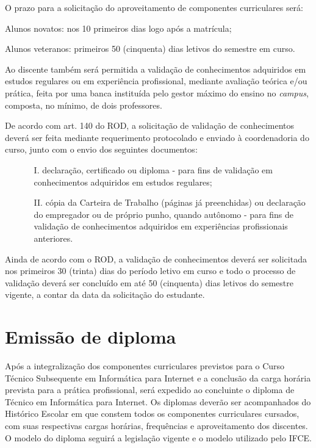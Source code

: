 \documentclass[
	12pt,				%
	openright,			%
	twoside,			%
	a4paper,			%
	chapter=TITLE,		%
	english,			%
	french,				%
	spanish,			%
	brazil,				%
	]{abntex2}
\begin{document}
O prazo para a solicitação do aproveitamento de componentes curriculares será:
\begin{alineas}
\item Alunos novatos: nos 10 primeiros dias logo após a matrícula;
\item  Alunos veteranos: primeiros 50 (cinquenta) dias letivos do semestre em curso.
\end{alineas} 

Ao discente também será permitida a validação de conhecimentos adquiridos em estudos regulares ou em experiência profissional, mediante avaliação teórica e/ou prática, feita por uma banca instituída pelo gestor máximo do ensino no \textit{campus}, composta, no mínimo, de dois professores. 

De acordo com art. 140 do ROD, a solicitação de validação de conhecimentos deverá ser feita mediante requerimento protocolado e enviado à coordenadoria do curso, junto com o envio dos seguintes documentos: 
\begin{itemize}
\item[]
\begin{itemize}
	\item [I.] declaração, certificado ou diploma - para fins de validação em conhecimentos adquiridos em estudos regulares; 
	\item [II.] cópia da Carteira de Trabalho (páginas já preenchidas) ou declaração do empregador ou de próprio punho, quando autônomo - para fins de validação de conhecimentos adquiridos em experiências profissionais anteriores. 
\end{itemize}
\end{itemize}

Ainda de acordo com o ROD, a validação de conhecimentos deverá ser solicitada nos primeiros 30 (trinta) dias do período letivo em curso e todo o processo de validação deverá ser concluído em até 50 (cinquenta) dias letivos do semestre vigente, a contar da data da solicitação do estudante. 


\chapter{Emissão de diploma}

Após a integralização dos componentes curriculares previstos para o Curso Técnico Subsequente em Informática para Internet e a conclusão da carga horária prevista para a prática profissional, será expedido ao concluinte o diploma de Técnico em Informática para Internet. Os diplomas deverão ser acompanhados do Histórico Escolar em que constem todos os componentes curriculares cursados, com suas respectivas cargas horárias, frequências e aproveitamento dos discentes. O modelo do diploma seguirá a legislação vigente e o modelo utilizado pelo IFCE.
\end{document}
